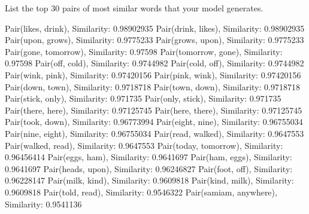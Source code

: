 \problem[1]
List the top 30 pairs of most similar words that your model generates.
\begin{solution}
	\newline
	Pair(likes, drink), Similarity: 0.98902935 \newline
	Pair(drink, likes), Similarity: 0.98902935 \newline
	Pair(upon, grows), Similarity: 0.9775233 \newline
	Pair(grows, upon), Similarity: 0.9775233 \newline
	Pair(gone, tomorrow), Similarity: 0.97598 \newline
	Pair(tomorrow, gone), Similarity: 0.97598 \newline
	Pair(off, cold), Similarity: 0.9744982 \newline
	Pair(cold, off), Similarity: 0.9744982 \newline
	Pair(wink, pink), Similarity: 0.97420156 \newline
	Pair(pink, wink), Similarity: 0.97420156 \newline
	Pair(down, town), Similarity: 0.9718718 \newline
	Pair(town, down), Similarity: 0.9718718 \newline
	Pair(stick, only), Similarity: 0.971735 \newline
	Pair(only, stick), Similarity: 0.971735 \newline
	Pair(there, here), Similarity: 0.97125745 \newline
	Pair(here, there), Similarity: 0.97125745 \newline
	Pair(took, down), Similarity: 0.96773994 \newline
	Pair(eight, nine), Similarity: 0.96755034 \newline
	Pair(nine, eight), Similarity: 0.96755034 \newline
	Pair(read, walked), Similarity: 0.9647553 \newline
	Pair(walked, read), Similarity: 0.9647553 \newline
	Pair(today, tomorrow), Similarity: 0.96456414 \newline
	Pair(eggs, ham), Similarity: 0.9641697 \newline
	Pair(ham, eggs), Similarity: 0.9641697 \newline
	Pair(heads, upon), Similarity: 0.96246827 \newline
	Pair(foot, off), Similarity: 0.96228147 \newline
	Pair(milk, kind), Similarity: 0.9609818 \newline
	Pair(kind, milk), Similarity: 0.9609818 \newline
	Pair(told, read), Similarity: 0.9546322 \newline
	Pair(samiam, anywhere), Similarity: 0.9541136 
\end{solution}

